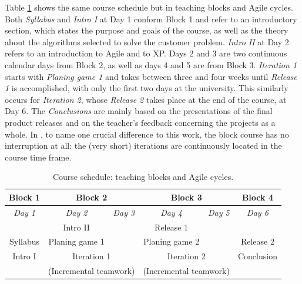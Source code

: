 \documentclass[conference]{IEEEtran}
\begin{document}
Table \ref{tab:Agileblocks} shows the same course schedule but in teaching blocks and Agile cycles. Both \textit{Syllabus} and \textit{Intro I} at Day 1 conform Block 1 and refer to an introductory section, which states the purpose and goals of the course, as well as the theory about the algorithms selected to solve the customer problem. \textit{Intro II} at Day 2 refers to an introduction to Agile and to XP. Days 2 and 3 are two continuous calendar days from Block 2, as well as days 4 and 5 are from Block 3. \textit{Iteration 1} starts with \textit{Planing game 1} and takes between three and four weeks until \textit{Release 1} is accomplished, with only the first two days at the university. This similarly occurs for \textit{Iteration 2}, whose \textit{Release 2} takes place at the end of the course, at Day 6. The \textit{Conclusions} are mainly based on the presentations of the final product releases and on the teacher's feedback concerning the projects as a whole. In \cite{StLuEr08}, to name one crucial difference to this work, the block course has no interruption at all: the (very short) iterations are continuously located in the course time frame.

\begin{table}[!t]
  \renewcommand{\arraystretch}{1.3}
  \setlength{\tabcolsep}{0.6em}
  \caption{Course schedule: teaching blocks and Agile cycles.}
  \label{tab:Agileblocks}
  \centering
  \begin{tabular}{|c|cc|cc|c|}
    \hline
    \bfseries Block 1 & \multicolumn{2}{|c|}{\bfseries Block 2} & \multicolumn{2}{|c|}{\bfseries Block 3} & \bfseries Block 4\\
    \hline
    \textit{Day 1} & \multicolumn{1}{|c|}{\textit{Day 2}} & \textit{Day 3} & \multicolumn{1}{|c|}{\textit{Day 4}} & \textit{Day 5} & \textit{Day 6}\\
    \hline
    \hline
    & \multicolumn{1}{|c|}{Intro II} &  & \multicolumn{1}{|c|}{Release 1} &  & \\
    Syllabus & \multicolumn{1}{|c|}{Planing game 1} &  & \multicolumn{1}{|c|}{Planing game 2} &  & Release 2 \\
    \cline{2-2}
    \cline{4-4}
    Intro I & \multicolumn{2}{|c|}{Iteration 1} & \multicolumn{2}{|c|}{Iteration 2} & Conclusion \\
    & \multicolumn{2}{|c|}{(Incremental teamwork)} & \multicolumn{2}{|c|}{(Incremental teamwork)} & \\
    \hline
\end{tabular}
\end{table}
\end{document}
